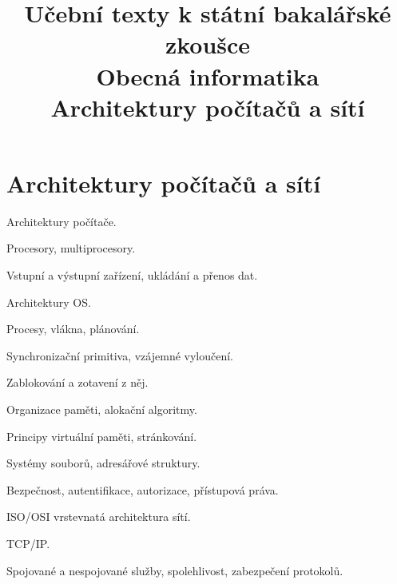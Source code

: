 \clearpage  \clearpage
\title{\LARGE Učební texty k státní bakalářské zkoušce \\ Obecná informatika \\ Architektury počítačů a sítí}

\maketitle
\newpage
\setcounter{section}{4}
\section{Architektury počítačů a sítí}
\begin{pozadavky}
\begin{pitemize}
\item Architektury počítače.
\item Procesory, multiprocesory.
\item Vstupní a výstupní zařízení, ukládání a přenos dat.
\item Architektury OS.
\item Procesy, vlákna, plánování.
\item Synchronizační primitiva, vzájemné vyloučení.
\item Zablokování a zotavení z něj.
\item Organizace paměti, alokační algoritmy.
\item Principy virtuální paměti, stránkování.
\item Systémy souborů, adresářové struktury.
\item Bezpečnost, autentifikace, autorizace, přístupová práva.
\item ISO/OSI vrstevnatá architektura sítí.
\item TCP/IP.
\item Spojované a nespojované služby, spolehlivost, zabezpečení protokolů.
\end{pitemize}
\end{pozadavky}







